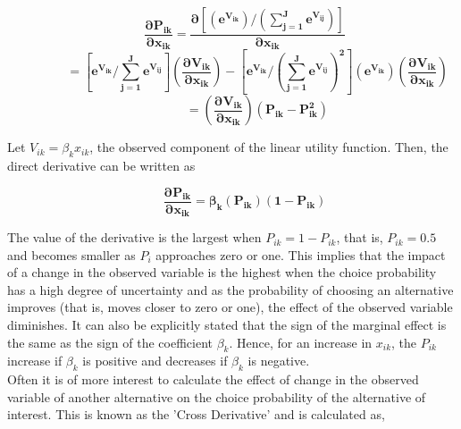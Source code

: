 \documentclass[a4paper,11pt]{article}
\begin{document}
        \begin{equation*}
            \qquad \mathbf{\dfrac{\partial P_{ik}}{\partial x_{ik}} = \dfrac{\partial \left[\left(e^{V_{ik}}\right) \bigg/  \left(\sum_{j=1}^{J}e^{V_{ij}}\right)\right]}{\partial x_{ik}}}
        \end{equation*}
        \begin{equation*}
            \qquad \qquad \mathbf{ = \left[ e^{V_{ik}} \bigg/ \sum_{j=1}^{J}e^{V_{ij}} \right] \left(\dfrac{\partial V_{ik}}{\partial x_{ik}}\right) - \left[ e^{V_{ik}} \bigg/ \left( \sum_{j=1}^{J}e^{V_{ij}} \right)^{2}\right]\left(e^{V_{ik}}\right) \left(\dfrac{\partial V_{ik}}{\partial x_{ik}}\right)}
        \end{equation*}
        \begin{equation*}
            \qquad \qquad \mathbf{ = \left(\dfrac{\partial V_{ik}}{\partial x_{ik}}\right) \left( P_{ik} - P_{ik}^{2} \right)}
        \end{equation*}

        Let $V_{ik} = \beta_{k}x_{ik}$, the observed component of the linear utility function. Then, the direct derivative can be written as

        \begin{equation*}
            \qquad \mathbf{\dfrac{\partial P_{ik}}{\partial x_{ik}} = \beta_{k}(P_{ik})(1 - P_{ik})}
        \end{equation*}

        The value of the derivative is the largest when $P_{ik} = 1 - P_{ik}$, that is, $P_{ik} = 0.5$ and becomes smaller as $P_{i}$ approaches zero or one. This implies that the impact of a change in the observed variable is the highest when the choice probability has a high degree of uncertainty and as the probability of choosing an alternative improves (that is, moves closer to zero or one), the effect of the observed variable diminishes. It can also be explicitly stated that the sign of the marginal effect is the same as the sign of the coefficient $\beta_{k}$. Hence, for an increase in $x_{ik}$, the $P_{ik}$ increase if $\beta_{k}$ is positive and decreases if $\beta_{k}$ is negative.\\

        Often it is of more interest to calculate the effect of change in the observed variable of another alternative on the choice probability of the alternative of interest. This is known as the 'Cross Derivative' and is calculated as,
\end{document}

